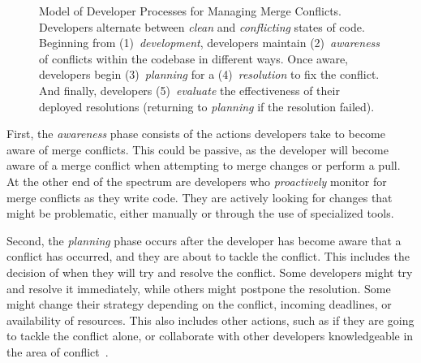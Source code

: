 \begin{figure}[!htbp]
\centering
{}
\caption{Model of Developer Processes for Managing Merge Conflicts. Developers alternate between \textit{clean} and \textit{conflicting} states of code. Beginning from (1)~\textit{development}, developers maintain (2)~\textit{awareness} of conflicts within the codebase in different ways. Once aware, developers begin (3)~\textit{planning} for a (4)~\textit{resolution} to fix the conflict. And finally, developers (5)~\textit{evaluate} the effectiveness of their deployed resolutions (returning to \emph{planning} if the resolution failed).\vspace*{-0.3\baselineskip}}
\label{model}
\end{figure}

First, the \emph{awareness} phase consists of the actions developers take to become aware of merge conflicts.
This could be passive, as the developer will become aware of a merge conflict when attempting to merge changes or perform a pull.
At the other end of the spectrum are developers who \emph{proactively} monitor for merge conflicts as they write code.
They are actively looking for changes that might be problematic, either manually or through the use of specialized tools.

Second, the \emph{planning} phase occurs after the developer has become aware that a conflict has occurred, and they are about to tackle the conflict.
This includes the decision of when they will try and resolve the conflict.
Some developers might try and resolve it immediately, while others might postpone the resolution.
Some might change their strategy depending on the conflict, incoming deadlines, or availability of resources.
This also includes other actions, such as if they are going to tackle the conflict alone, or collaborate with other developers knowledgeable in the area of conflict~\cite{CostaSarma}.

